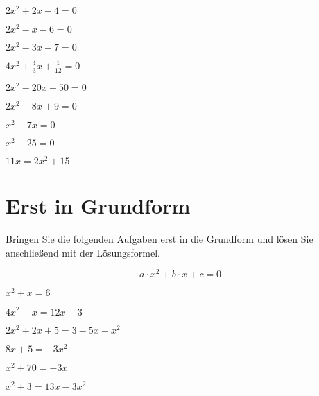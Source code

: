 \begin{bbwAufgabenBlock}
\item $2x^2+2x -4 = 0$

\item $2x^2 - x - 6 = 0$

\item $2x^2-3x-7 = 0$

\item $4x^2+\frac43 x + \frac1{12} =0 $

\item $ 2x^2 -20x + 50 = 0 $
\LoesungsBlock{$\lx=\left\{ 5 \right\}$}

\item $2x^2 -8x +9 =0 $
\LoesungsBlock{$\lx=\left\{  \right\}$}

\item $ x^2-7x= 0$

\item $ x^2-25 =0 $

\item $11x=2x^2+15 $


\end{bbwAufgabenBlock}
\newpage
\section{Erst in Grundform}
Bringen Sie die folgenden Aufgaben erst in die Grundform und lösen Sie anschließend mit der Lösungsformel.

$$a\cdot{}x^2 + b\cdot{}x + c = 0$$

\begin{bbwAufgabenBlock}
\item $ x^2+x= 6$

\item $4x^2-x =12x-3 $

\item $ 2x^2+2x+5 = 3-5x-x^2 $

\item $ 8x + 5 = -3x^2 $

\item $x^2 + 70 = -3x$
\LoesungsBlock{$\lx=\left\{    \right\}$}

\item $ x^2+3= 13x-3x^2$

\end{bbwAufgabenBlock}
\newpage
